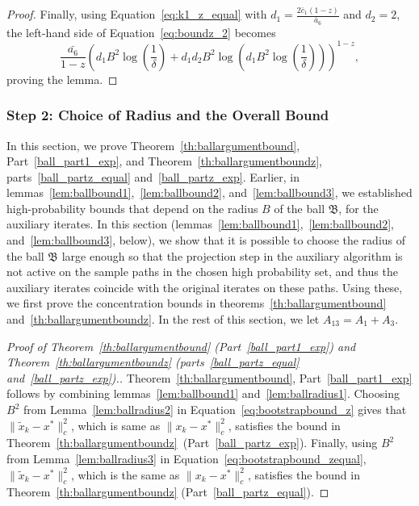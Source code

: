 \documentclass{article}
\newcommand{\lrp}[1]{\left( #1 \right)}
\begin{document}
\begin{proof}
Finally, using Equation~\eqref{eq:k1_z_equal} with $d_1 = \tfrac{2 \bar{c}_1 (1-z)}{\bar{a}_6} $ and $d_2 = 2$, the left-hand side of Equation~\eqref{eq:boundz_2} becomes
\[ \frac{\bar{a_6}}{1-z}{ \lrp{d_1 B^2 \log\lrp{\frac{1}{\delta}} + d_1 d_2 B^2 \log\lrp{ d_1 B^2 \log\lrp{\frac{1}{\delta}} }}^{1-z} }, \]
proving the lemma.
\end{proof}

\subsubsection{Step 2: Choice of Radius and the Overall Bound}\label{app:proof_th:ball_part1}
In this section, we prove Theorem~\ref{th:ballargumentbound}, Part~\ref{ball_part1_exp}, and Theorem~\ref{th:ballargumentboundz}, parts~\ref{ball_partz_equal} and~\ref{ball_partz_exp}. Earlier, in lemmas~\ref{lem:ballbound1},~\ref{lem:ballbound2}, and~\ref{lem:ballbound3}, we established high-probability bounds that depend on the radius $B$ of the ball $\mathfrak B$, for the auxiliary iterates. In this section (lemmas~\ref{lem:ballbound1},~\ref{lem:ballbound2}, and~\ref{lem:ballbound3}, below), we show that it is possible to choose the radius of the ball $\mathfrak B$ large enough so that the projection step in the auxiliary algorithm is not active on the sample paths in the chosen high probability set, and thus the auxiliary iterates coincide with the original iterates on these paths. Using these, we first prove the concentration bounds in theorems~\ref{th:ballargumentbound} and~\ref{th:ballargumentboundz}. In the rest of this section, we let $A_{13} = A_1 + A_3$. 

\begin{proof}[Proof of Theorem~\ref{th:ballargumentbound} (Part~\ref{ball_part1_exp}) and Theorem~\ref{th:ballargumentboundz} (parts~\ref{ball_partz_equal} and~\ref{ball_partz_exp}).]
Theorem~\ref{th:ballargumentbound}, Part~\ref{ball_part1_exp} follows by combining lemmas~\ref{lem:ballbound1} and~\ref{lem:ballradius1}. Choosing $B^2$ from Lemma~\ref{lem:ballradius2} in Equation~\eqref{eq:bootstrapbound_z} gives that $\|\tilde{x}_k-x^*\|^2_c$, which is same as $\|x_k - x^*\|^2_c$, satisfies the bound in Theorem~\ref{th:ballargumentboundz}~(Part~\ref{ball_partz_exp}). Finally, using  $B^2$  from Lemma~\ref{lem:ballradius3} in Equation~\eqref{eq:bootstrapbound_zequal}, $\|\tilde{x}_k-x^*\|^2_c$, which is the same as $\|x_k - x^*\|^2_c$, satisfies the bound in Theorem~\ref{th:ballargumentboundz} (Part~\ref{ball_partz_equal}). 
\end{proof}
\end{document}
